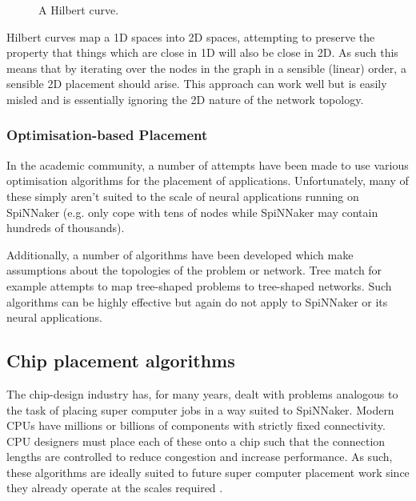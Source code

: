 				\begin{figure}
					\center
					
					\caption{A Hilbert curve.}
					\label{fig:hilbert-placement}
				\end{figure}
				
				Hilbert curves map a 1D spaces into 2D spaces, attempting to preserve
				the property that things which are close in 1D will also be close in
				2D. As such this means that by iterating over the nodes in the graph in
				a sensible (linear) order, a sensible 2D placement should arise. This
				approach can work well but is easily misled and is essentially ignoring
				the 2D nature of the network topology.
			
			\subsubsection{Optimisation-based Placement}
				
				
				In the academic community, a number of attempts have been made to use
				various optimisation algorithms for the placement of applications.
				Unfortunately, many of these simply aren't suited to the scale of
				neural applications running on SpiNNaker (e.g. only cope with tens of
				nodes while SpiNNaker may contain hundreds of thousands).
				
				Additionally, a number of algorithms have been developed which make
				assumptions about the topologies of the problem or network. Tree match
				for example attempts to map tree-shaped problems to tree-shaped
				networks. Such algorithms can be highly effective but again do not
				apply to SpiNNaker or its neural applications.
		
		\subsection{Chip placement algorithms}
			
			The chip-design industry has, for many years, dealt with problems
			analogous to the task of placing super computer jobs in a way suited to
			SpiNNaker. Modern CPUs have millions or billions of components with
			strictly fixed connectivity. CPU designers must place each of these onto
			a chip such that the connection lengths are controlled to reduce
			congestion and increase performance. As such, these algorithms are
			ideally suited to future super computer placement work since they already
			operate at the scales required \cite{nam07}.
			
